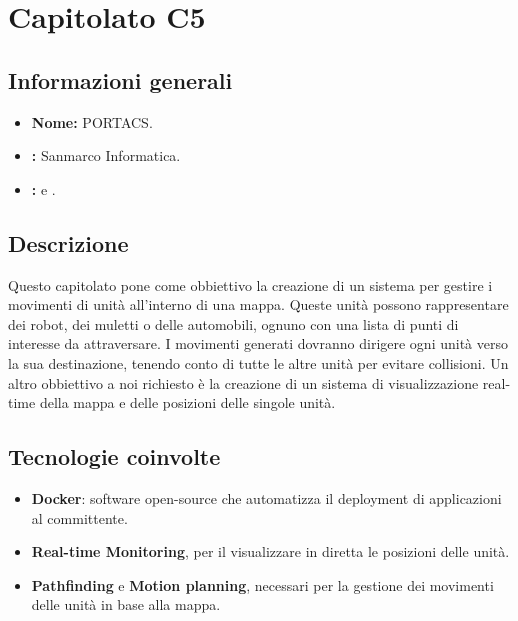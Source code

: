 \section{Capitolato C5}

\subsection{Informazioni generali}
\begin{itemize}
\item \textbf{Nome:} PORTACS.
\item \textbf{\commitProg:} Sanmarco Informatica.
\item \textbf{\proponProg:} \VT{} e \CR.
\end{itemize}

\subsection{Descrizione}
Questo capitolato pone come obbiettivo la creazione di un sistema per gestire i movimenti di unità all'interno di una mappa. Queste unità possono rappresentare dei robot, dei muletti o delle automobili, ognuno con una lista di punti di interesse da attraversare. I movimenti generati dovranno dirigere ogni unità verso la sua destinazione, tenendo conto di tutte le altre unità per evitare collisioni.
Un altro obbiettivo a noi richiesto è la creazione di un sistema di visualizzazione real-time della mappa e delle posizioni delle singole unità.

\subsection{Tecnologie coinvolte}
\begin{itemize}
\item \textbf{Docker}: software open-source che automatizza il deployment di applicazioni al committente.
\item \textbf{Real-time Monitoring}, per il visualizzare in diretta le posizioni delle unità.
\item \textbf{Pathfinding} e \textbf{Motion planning}, necessari per la gestione dei movimenti delle unità in base alla mappa.
\end{itemize}

